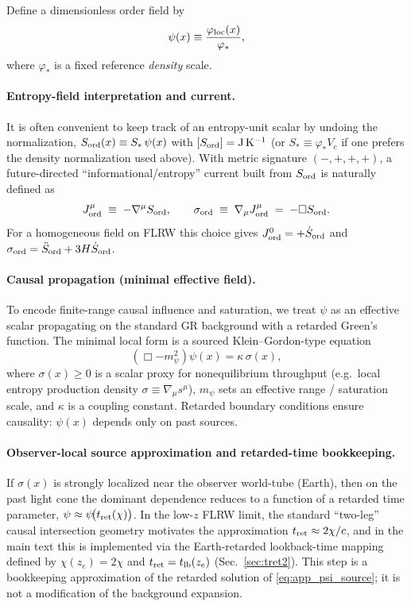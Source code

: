 \documentclass[10pt]{article}
\newcommand{\tlb}{t_{\mathrm{lb}}}
\begin{document}
Define a dimensionless order field by
\begin{equation}
\psi(x)\equiv \frac{\varphi_{\rm loc}(x)}{\varphi_\ast},
\label{eq:app_psi_def}
\end{equation}
where $\varphi_\ast$ is a fixed reference \emph{density} scale.

\paragraph{Entropy-field interpretation and current.}
It is often convenient to keep track of an entropy-unit scalar by undoing the normalization,
$S_{\rm ord}(x)\equiv S_\ast\,\psi(x)$ with $[S_{\rm ord}]={\rm J\,K^{-1}}$ (or $S_\ast\equiv\varphi_\ast V_c$
if one prefers the density normalization used above).
With metric signature $(-,+,+,+)$, a future-directed ``informational/entropy'' current built from $S_{\rm ord}$
is naturally defined as
\begin{equation}
J^\mu_{\rm ord}\;\equiv\;-\nabla^\mu S_{\rm ord},
\qquad
\sigma_{\rm ord}\;\equiv\;\nabla_\mu J^\mu_{\rm ord}\;=\;-\Box S_{\rm ord}.
\label{eq:app_entropy_current}
\end{equation}
For a homogeneous field on FLRW this choice gives $J^0_{\rm ord}=+\dot S_{\rm ord}$ and
$\sigma_{\rm ord}=\ddot S_{\rm ord}+3H\dot S_{\rm ord}$.

\paragraph{Causal propagation (minimal effective field).}
To encode finite-range causal influence and saturation, we treat $\psi$ as an effective scalar
propagating on the standard GR background with a retarded Green’s function. The minimal local form
is a sourced Klein--Gordon-type equation
\begin{equation}
(\Box - m_\psi^2)\psi(x) = \kappa\,\sigma(x),
\label{eq:app_psi_source}
\end{equation}
where $\sigma(x)\ge0$ is a scalar proxy for nonequilibrium throughput (e.g.\ local entropy
production density $\sigma\equiv\nabla_\mu s^\mu$), $m_\psi$ sets an effective range / saturation
scale, and $\kappa$ is a coupling constant. Retarded boundary conditions ensure causality:
$\psi(x)$ depends only on past sources.

\paragraph{Observer-local source approximation and retarded-time bookkeeping.}
If $\sigma(x)$ is strongly localized near the observer world-tube (Earth), then on the past light
cone the dominant dependence reduces to a function of a retarded time parameter,
$\psi\approx \psi\!\bigl(t_{\rm ret}(\chi)\bigr)$.
In the low-$z$ FLRW limit, the standard ``two-leg'' causal intersection geometry motivates the
approximation $t_{\rm ret}\approx 2\chi/c$, and in the main text this is implemented via the
Earth-retarded lookback-time mapping defined by $\chi(z_e)=2\chi$ and $t_{\rm ret}=\tlb(z_e)$
(Sec.~\ref{sec:tret2}). This step is a bookkeeping approximation of the retarded solution of
\eqref{eq:app_psi_source}; it is not a modification of the background expansion.
\end{document}
